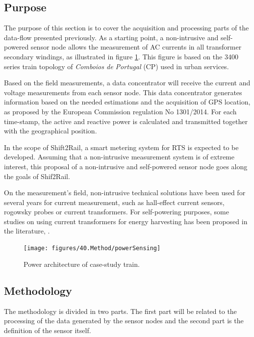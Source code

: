 \subsection{Purpose}

The purpose of this section is to cover the acquisition and processing parts of the data-flow presented previously. As a starting point, a non-intrusive and self-powered sensor node allows the measurement of AC currents in all transformer secondary windings, as illustrated in figure \ref{fig:4.powerSensing}. This figure is based on the 3400 series train topology of \textit{Comboios de Portugal} (CP) used in urban services.

Based on the field measurements, a data concentrator will receive the current and voltage measurements from each sensor node. This data concentrator generates information based on the needed estimations and the acquisition of \ac{GPS} location, as proposed by the European Commission regulation No 1301/2014. For each time-stamp, the active and reactive power is calculated and transmitted together with the geographical position.

In the scope of Shift2Rail, a smart metering system for \ac{RTS} is expected to be developed. Assuming that a non-intrusive measurement system is of extreme interest, this proposal of a non-intrusive and self-powered sensor node goes along the goals of Shif2Rail.

On the measurement's field, non-intrusive technical solutions have been used for several years for current measurement, such as hall-effect current sensors, rogowsky probes or current transformers.
For self-powering purposes, some studies on using current transformers for energy harvesting has been proposed in the literature, \cite{ahola2008, wu2013, moon2015, amaro2015, brunelli2016}.


\begin{figure}[h!]
	\centering
	\vspace{-1em}
	\texttt{[image: figures/40.Method/powerSensing]}
	\caption{Power architecture of case-study train.}
	\label{fig:4.powerSensing}
\end{figure}






\subsection{Methodology}

The methodology is divided in two parts. The first part will be related to the processing of the data generated by the sensor nodes and the second part is the definition of the sensor itself.

